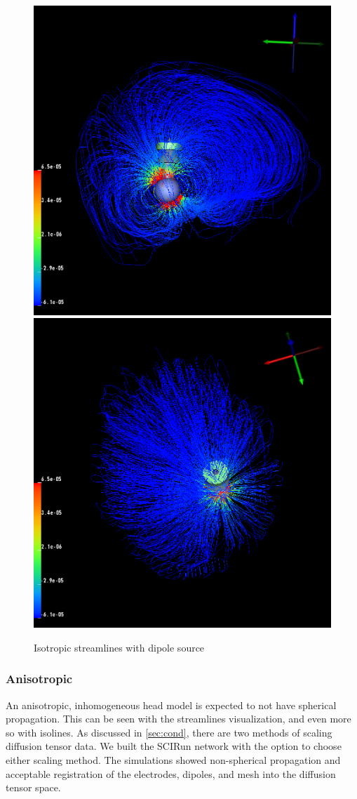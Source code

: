 \begin{figure}[H]
\begin{center}
\includegraphics[width=.49\textwidth]{Figures/iso_streamlines}
\includegraphics[width=.49\textwidth]{Figures/iso_streamlines_top}
\caption{Isotropic streamlines with dipole source}
\label{fig:isostream}
\end{center}
\end{figure}

\subsubsection{Anisotropic}

An anisotropic, inhomogeneous head model is expected to not have spherical propagation. This can be seen with the streamlines visualization, and even more so with isolines. As discussed in \ref{sec:cond}, there are two methods of scaling diffusion tensor data. We built the SCIRun network with the option to choose either scaling method. The simulations showed non-spherical propagation and acceptable registration of the electrodes, dipoles, and mesh into the diffusion tensor space.

